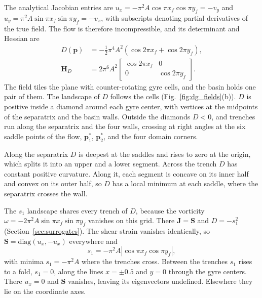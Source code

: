 \documentclass[lettersize,journal]{IEEEtran}
\begin{document}
The analytical Jacobian entries are
$u_x = -\pi^2 A \cos\pi x_f \cos\pi y_f = -v_y$ and
$u_y = \pi^2 A \sin\pi x_f \sin\pi y_f = -v_x$, with subscripts denoting
partial derivatives of the true field. The flow is therefore
incompressible, and its determinant and Hessian are
\begin{equation}
\begin{aligned}
D(\mathbf{p}) &= -\tfrac{1}{2}\pi^4 A^2 \left(\cos 2\pi x_f + \cos 2\pi y_f\right),\\
\mathbf{H}_D &= 2\pi^6 A^2
\begin{bmatrix} \cos 2\pi x_f & 0 \\ 0 & \cos 2\pi y_f \end{bmatrix}.
\end{aligned}
\label{eq:det_analytic_main}
\end{equation}
The field tiles the plane with counter-rotating gyre cells, and the basin
holds one pair of them. The landscape of $D$ follows the cells
(Fig.~\ref{fig:dg_fields}(b)). $D$ is positive inside a diamond around each
gyre center, with vertices at the midpoints of the separatrix and the basin
walls. Outside the diamonds $D < 0$, and trenches run along the separatrix
and the four walls, crossing at right angles at the six saddle points of the
flow, $\mathbf{p}_1^*$, $\mathbf{p}_2^*$, and the four domain corners.

Along the separatrix $D$ is deepest at the saddles and rises to zero at the
origin, which splits it into an upper and a lower segment. Across the trench
$D$ has constant positive curvature. Along it, each segment is concave on its
inner half and convex on its outer half, so $D$ has a local minimum at each
saddle, where the separatrix crosses the wall.

The $s_1$ landscape shares every trench of $D$, because the vorticity
$\omega = -2\pi^2 A \sin\pi x_f \sin\pi y_f$ vanishes on this grid. There
$\mathbf{J} = \mathbf{S}$ and $D = -s_1^2$ (Section~\ref{sec:surrogates}).
The shear strain vanishes identically, so
$\mathbf{S} = \mathrm{diag}(u_x, -u_x)$ everywhere and
\begin{equation}
s_1 = -\pi^2 A \left|\cos\pi x_f \cos\pi y_f\right|,
\label{eq:s1_analytic_main}
\end{equation}
with minima $s_1 = -\pi^2 A$ where the trenches cross. Between the trenches
$s_1$ rises to a fold, $s_1 = 0$, along the lines $x = \pm 0.5$ and $y = 0$
through the gyre centers. There $u_x = 0$ and $\mathbf{S}$ vanishes, leaving
its eigenvectors undefined. Elsewhere they lie on the coordinate axes.
\end{document}
